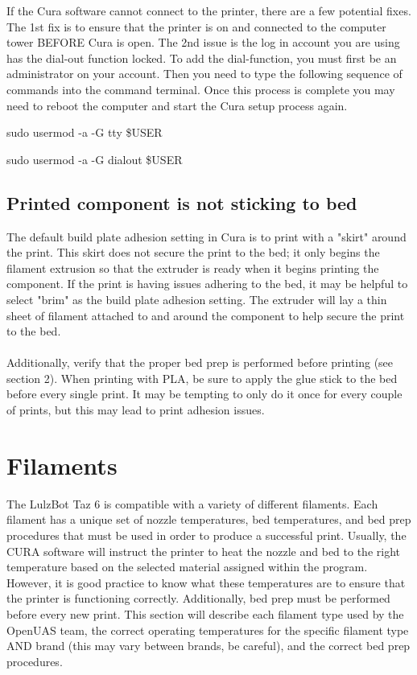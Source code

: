 \documentclass{article}
\begin{document}
If the Cura software cannot connect to the printer, there are a few potential fixes. The 1st fix is to ensure that the printer is on and connected to the computer tower BEFORE Cura is open. The 2nd issue is the log in account you are using has the dial-out function locked. To add the dial-function, you must first be an administrator on your account. Then you need to type the following sequence of commands into the command terminal. Once this process is complete you may need to reboot the computer and start the Cura setup process again.

sudo usermod -a -G tty \$USER

sudo usermod -a -G dialout \$USER

\subsection{Printed component is not sticking to bed}

The default build plate adhesion setting in Cura is to print with a "skirt" around the print. This skirt does not secure the print to the bed; it only begins the filament extrusion so that the extruder is ready when it begins printing the component. If the print is having issues adhering to the bed, it may be helpful to select "brim" as the build plate adhesion setting. The extruder will lay a thin sheet of filament attached to and around the component to help secure the print to the bed. 
\\
\\Additionally, verify that the proper bed prep is performed before printing (see section 2). When printing with PLA, be sure to apply the glue stick to the bed before every single print. It may be tempting to only do it once for every couple of prints, but this may lead to print adhesion issues. 

\section{Filaments}

The LulzBot Taz 6 is compatible with a variety of different filaments. Each filament has a unique set of nozzle temperatures, bed temperatures, and bed prep procedures that must be used in order to produce a successful print. Usually, the CURA software will instruct the printer to heat the nozzle and bed to the right temperature based on the selected material assigned within the program. However, it is good practice to know what these temperatures are to ensure that the printer is functioning correctly. Additionally, bed prep must be performed before every new print. This section will describe each filament type used by the OpenUAS team, the correct operating temperatures for the specific filament type AND brand (this may vary between brands, be careful), and the correct bed prep procedures.
\end{document}

